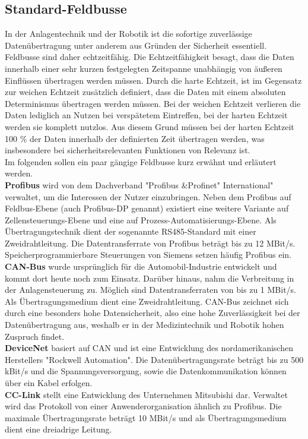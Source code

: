 \documentclass[ a4paper,
                oneside,
                toc=bibliography,
                toc=listof
                ]{scrbook}
\begin{document}
	\subsection{Standard-Feldbusse}
	In der Anlagentechnik und der Robotik ist die sofortige zuverlässige Datenübertragung unter anderem aus Gründen der Sicherheit essentiell. Feldbusse sind daher echtzeitfähig. Die Echtzeitfähigkeit besagt, dass die Daten innerhalb einer sehr kurzen festgelegten Zeitspanne unabhängig von äußeren Einflüssen übertragen werden müssen. Durch die harte Echtzeit, ist im Gegensatz zur weichen Echtzeit zusätzlich definiert, dass die Daten mit einem absoluten Determinismus übertragen werden müssen. Bei der weichen Echtzeit verlieren die Daten lediglich an Nutzen bei verspätetem Eintreffen, bei der harten Echtzeit werden sie komplett nutzlos. Aus diesem Grund müssen bei der harten Echtzeit 100 \% der Daten innerhalb der definierten Zeit übertragen werden, was insbesondere bei sicherheitsrelevanten Funktionen von Relevanz ist. \cite{dopatka2008framework} \cite{Echtzeit} \\
	Im folgenden sollen ein paar gängige Feldbusse kurz erwähnt und erläutert werden.\\
	\textbf{Profibus} wird von dem Dachverband "Profibus \&Profinet" International" verwaltet, um die Interessen der Nutzer einzubringen. Neben dem Profibus auf Feldbus-Ebene (auch Profibus-DP genannt) existiert eine weitere Variante auf Zellensteuerungs-Ebene und eine auf Prozess-Automatisierungs-Ebene. Als Übertragungstechnik dient der sogenannte RS485-Standard mit einer Zweidrahtleitung. Die Datentransferrate von Profibus beträgt bis zu 12 MBit/s. Speicherprogrammierbare Steuerungen von Siemens setzen häufig Profibus ein.  \cite{hering2012elektrotechnik}\\
	\textbf{CAN-Bus} wurde ursprünglich für die Automobil-Industrie entwickelt und kommt dort heute noch zum Einsatz. Darüber hinaus, nahm die Verbreitung in der Anlagensteuerung zu. Möglich sind Datentransferraten von bis zu 1 MBit/s. Als Übertragungsmedium dient eine Zweidrahtleitung.  CAN-Bus zeichnet sich durch eine besonders hohe Datensicherheit, also eine hohe Zuverlässigkeit bei der Datenübertragung aus, weshalb er in der Medizintechnik und Robotik hohen Zuspruch findet. \cite{hering2012elektrotechnik}\\
	\textbf{DeviceNet} basiert auf CAN und ist eine Entwicklung des nordamerikanischen Herstellers "Rockwell Automation". Die Datenübertragungsrate beträgt bis zu 500 kBit/s und die Spannungsversorgung, sowie die Datenkommunikation können über ein Kabel erfolgen. \cite{hering2012elektrotechnik}\\
	\textbf{CC-Link} stellt eine Entwicklung des Unternehmen Mitsubishi dar. Verwaltet wird das Protokoll von einer Anwenderorganisation ähnlich zu Profibus. Die maximale Übertragungsrate beträgt 10 MBit/s und als Übertragungsmedium dient eine dreiadrige Leitung. \cite{hering2012elektrotechnik}\\
	\label{subsec:StandardFeldbus}
\end{document}
